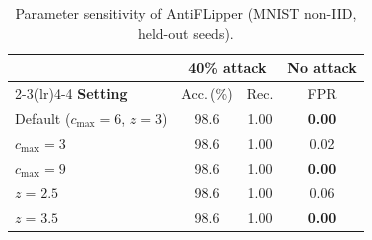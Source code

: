 \begin{table}[t]
\centering
\caption{Parameter sensitivity of AntiFLipper (MNIST non-IID, held-out seeds).}
\label{tab:sensitivity}
\footnotesize
\setlength{\tabcolsep}{5pt}
\begin{tabular}{@{}l ccc@{}}
\toprule
& \multicolumn{2}{c}{\textbf{40\% attack}} & \textbf{No attack} \\
\cmidrule(lr){2-3}\cmidrule(lr){4-4}
\textbf{Setting} & Acc.\,(\%) & Rec. & FPR \\
\midrule
Default ($c_{\max}{=}6$, $z{=}3$) & 98.6 & 1.00 & \textbf{0.00} \\
\midrule
$c_{\max}=3$ & 98.6 & 1.00 & 0.02 \\
$c_{\max}=9$ & 98.6 & 1.00 & \textbf{0.00} \\
$z=2.5$ & 98.6 & 1.00 & 0.06 \\
$z=3.5$ & 98.6 & 1.00 & \textbf{0.00} \\
\bottomrule
\end{tabular}
\end{table}
